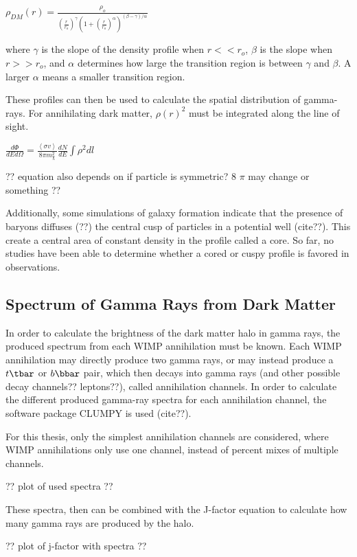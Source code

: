     $ \rho_{DM} \left( r \right) = \frac{\rho_o}{ {\left( \frac{r}{r_o} \right)}^{\gamma} {\left( 1 + {\left( \frac{r}{r_o} \right)}^{\alpha} \right)}^{ \left(\beta - \gamma \right) / \alpha} } $ \label{eqn:zhao}

    where $\gamma$ is the slope of the density profile when $r << r_o$, $\beta$ is the slope when $r >> r_o$, and $\alpha$ determines how large the transition region is between $\gamma$ and $\beta$.
    A larger $\alpha$ means a smaller transition region.

    These profiles can then be used to calculate the spatial distribution of gamma-rays.
    For annihilating dark matter, $\rho\left(r\right)^2$ must be integrated along the line of sight.

    $ \frac{d\Phi}{dE d\Omega}= \frac{ \left \langle \sigma v \right \rangle }{8 \pi m_\chi^2} \frac{dN}{dE} \int \rho^2 dl $ \label{eqn:dmflux}

    ?? equation also depends on if particle is symmetric? 8 $\pi$ may change or something ??
    
    Additionally, some simulations of galaxy formation indicate that the presence of baryons diffuses (??) the central cusp of particles in a potential well (cite??).
    This create a central area of constant density in the profile called a core.
    So far, no studies have been able to determine whether a cored or cuspy profile is favored in observations.

    
  \subsection{Spectrum of Gamma Rays from Dark Matter}
    In order to calculate the brightness of the dark matter halo in gamma rays, the produced spectrum from each WIMP annihilation must be known.
    Each WIMP annihilation may directly produce two gamma rays, or may instead produce a $t\tbar$ or $b\bbar$ pair, which then decays into gamma rays (and other possible decay channels?? leptons??), called annihilation channels.
    In order to calculate the different produced gamma-ray spectra for each annihilation channel, the software package CLUMPY is used (cite??).

    For this thesis, only the simplest annihilation channels are considered, where WIMP annihilations only use one channel, instead of percent mixes of multiple channels.

    ?? plot of used spectra ??

    These spectra, then can be combined with the J-factor equation to calculate how many gamma rays are produced by the halo.

    ?? plot of j-factor with spectra ??


